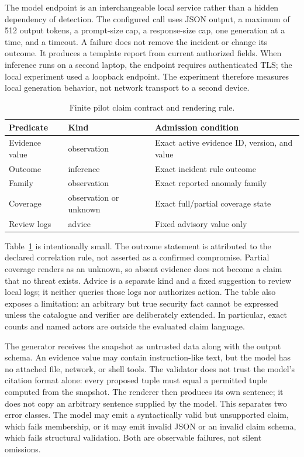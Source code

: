The model endpoint is an interchangeable local service rather than a hidden dependency of detection. The configured call uses JSON output, a maximum of 512 output tokens, a prompt-size cap, a response-size cap, one generation at a time, and a timeout. A failure does not remove the incident or change its outcome. It produces a template report from current authorized fields. When inference runs on a second laptop, the endpoint requires authenticated TLS; the local experiment used a loopback endpoint. The experiment therefore measures local generation behavior, not network transport to a second device.

\begin{table}[t]
\centering\caption{Finite pilot claim contract and rendering rule.}
\label{tab:contract}
\begin{tabular}{p{}p{}p{}}
\hline
Predicate & Kind & Admission condition\\\hline
Evidence value & observation & Exact active evidence ID, version, and value\\
Outcome & inference & Exact incident rule outcome\\
Family & observation & Exact reported anomaly family\\
Coverage & observation or unknown & Exact full/partial coverage state\\
Review logs & advice & Fixed advisory value only\\\hline
\end{tabular}
\end{table}

Table~\ref{tab:contract} is intentionally small. The outcome statement is attributed to the declared correlation rule, not asserted as a confirmed compromise. Partial coverage renders as an unknown, so absent evidence does not become a claim that no threat exists. Advice is a separate kind and a fixed suggestion to review local logs; it neither queries those logs nor authorizes action. The table also exposes a limitation: an arbitrary but true security fact cannot be expressed unless the catalogue and verifier are deliberately extended. In particular, exact counts and named actors are outside the evaluated claim language.

The generator receives the snapshot as untrusted data along with the output schema. An evidence value may contain instruction-like text, but the model has no attached file, network, or shell tools. The validator does not trust the model's citation format alone: every proposed tuple must equal a permitted tuple computed from the snapshot. The renderer then produces its own sentence; it does not copy an arbitrary sentence supplied by the model. This separates two error classes. The model may emit a syntactically valid but unsupported claim, which fails membership, or it may emit invalid JSON or an invalid claim schema, which fails structural validation. Both are observable failures, not silent omissions.

